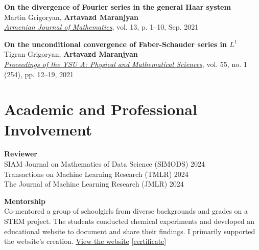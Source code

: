 \documentclass[11pt,a4paper,sans]{moderncv}        %
\begin{document}
\begin{etaremune}
\vspace{2mm}

\item \textbf{On the divergence of Fourier series in the general Haar system}\\
Martin Grigoryan, \textbf{Artavazd Maranjyan}\\ \textcolor{accent}{\href{https://doi.org/10.52737/18291163-2021.13.6-1-10}{\textit{Armenian Journal of Mathematics}}}, vol. 13, p. 1–10, Sep. 2021

\vspace{2mm}

\item \textbf{On the unconditional convergence of Faber-Schauder series in $L^1$}\\
Tigran Grigoryan, \textbf{Artavazd Maranjyan}\\
\textcolor{accent}{\href{http://www.old.ysu.am/files/vol55\_no1\_2021\_pp12\%E2\%80\%9319.pdf}{\textit{Proceedings of the YSU A: Physical and Mathematical Sciences}}}, vol. 55, no. 1 (254), pp. 12–19, 2021
\end{etaremune}

\section{Academic and Professional Involvement}
\vspace{4pt}

\textbf{Reviewer}\\
SIAM Journal on Mathematics of Data Science (SIMODS) 2024\\
Transactions on Machine Learning Research (TMLR) 2024\\
The Journal of Machine Learning Research (JMLR) 2024

\vspace{10pt}

\textbf{Mentorship}\\
Co-mentored a group of schoolgirls from diverse backgrounds and grades on a STEM project. 
The students conducted chemical experiments and developed an educational website to document and share their findings. 
I primarily supported the website's creation.  
\href{https://artomaranjyan.github.io/cheminno/}{View the website} [\textcolor{accent}{\href{https://artomaranjyan.github.io/assets/pdf/feminno_certificate.pdf}{certificate}}]

\vspace{10pt}
\end{document}
